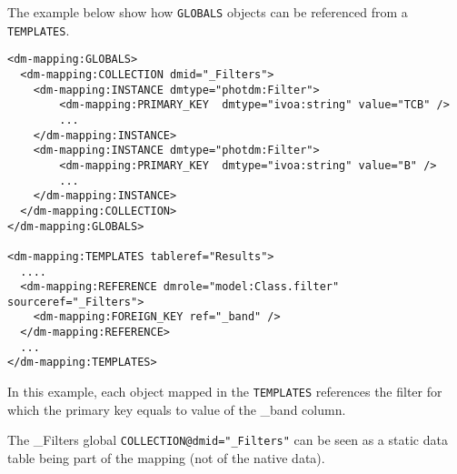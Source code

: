 The example below show how \texttt{GLOBALS} objects can be referenced from a  \texttt{TEMPLATES}. 

\begin{lstlisting}[frame=single,caption={Dynamic reference example},style=XML,basicstyle=\tiny]
<dm-mapping:GLOBALS>
  <dm-mapping:COLLECTION dmid="_Filters">
    <dm-mapping:INSTANCE dmtype="photdm:Filter">
		<dm-mapping:PRIMARY_KEY  dmtype="ivoa:string" value="TCB" />
		...
	</dm-mapping:INSTANCE>
	<dm-mapping:INSTANCE dmtype="photdm:Filter">
		<dm-mapping:PRIMARY_KEY  dmtype="ivoa:string" value="B" />
		...
	</dm-mapping:INSTANCE>
  </dm-mapping:COLLECTION>
</dm-mapping:GLOBALS>

<dm-mapping:TEMPLATES tableref="Results">
  ....
  <dm-mapping:REFERENCE	dmrole="model:Class.filter"	sourceref="_Filters">
    <dm-mapping:FOREIGN_KEY ref="_band" />
  </dm-mapping:REFERENCE>
  ...
</dm-mapping:TEMPLATES>

\end{lstlisting}  

In this example, each object mapped in the \texttt{TEMPLATES} references the filter for which the primary key equals to value of the \_band column.

The \_Filters global \texttt{COLLECTION@dmid="\_Filters"} can be seen as a static data table being part of the mapping (not of the native data).

